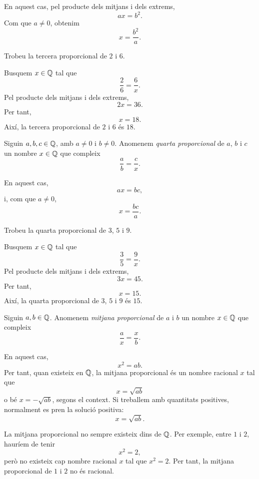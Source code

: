 En aquest cas, pel producte dels mitjans i dels extrems,
\[
	ax=b^2.
\]
Com que \(a\neq0\), obtenim
\[
	x=\frac{b^2}{a}.
\]

\begin{exemple}
Trobeu la tercera proporcional de \(2\) i \(6\).
\end{exemple}

\begin{solucio}
Busquem \(x\in\mathbb{Q}\) tal que
\[
	\frac{2}{6}=\frac{6}{x}.
\]
Pel producte dels mitjans i dels extrems,
\[
	2x=36.
\]
Per tant,
\[
	x=18.
\]
Així, la tercera proporcional de \(2\) i \(6\) és \(18\).
\end{solucio}

\begin{definicio}
Siguin \(a,b,c\in\mathbb{Q}\), amb \(a\neq0\) i \(b\neq0\). Anomenem \emph{quarta proporcional} de \(a\), \(b\) i \(c\) un nombre \(x\in\mathbb{Q}\) que compleix
\[
	\frac{a}{b}=\frac{c}{x}.
\]
\end{definicio}

En aquest cas,
\[
	ax=bc,
\]
i, com que \(a\neq0\),
\[
	x=\frac{bc}{a}.
\]

\begin{exemple}
Trobeu la quarta proporcional de \(3\), \(5\) i \(9\).
\end{exemple}

\begin{solucio}
Busquem \(x\in\mathbb{Q}\) tal que
\[
	\frac{3}{5}=\frac{9}{x}.
\]
Pel producte dels mitjans i dels extrems,
\[
	3x=45.
\]
Per tant,
\[
	x=15.
\]
Així, la quarta proporcional de \(3\), \(5\) i \(9\) és \(15\).
\end{solucio}

\begin{definicio}
Siguin \(a,b\in\mathbb{Q}\). Anomenem \emph{mitjana proporcional} de \(a\) i \(b\) un nombre \(x\in\mathbb{Q}\) que compleix
\[
	\frac{a}{x}=\frac{x}{b}.
\]
\end{definicio}

En aquest cas,
\[
	x^2=ab.
\]
Per tant, quan existeix en \(\mathbb{Q}\), la mitjana proporcional és un nombre racional \(x\) tal que
\[
	x=\sqrt{ab}
\]
o bé \(x=-\sqrt{ab}\), segons el context. Si treballem amb quantitats positives, normalment es pren la solució positiva:
\[
	x=\sqrt{ab}.
\]

\begin{observacio}
La mitjana proporcional no sempre existeix dins de \(\mathbb{Q}\). Per exemple, entre \(1\) i \(2\), hauríem de tenir
\[
	x^2=2,
\]
però no existeix cap nombre racional \(x\) tal que \(x^2=2\). Per tant, la mitjana proporcional de \(1\) i \(2\) no és racional.
\end{observacio}

